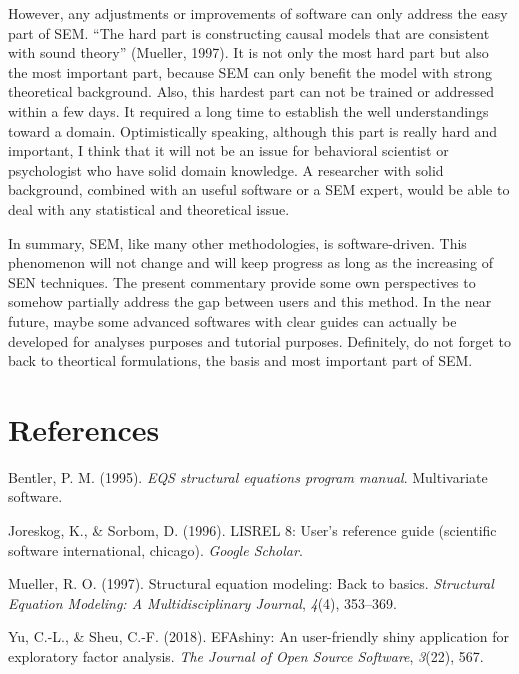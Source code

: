 \documentclass[jou]{apa6}
\theoremstyle{definition}
\theoremstyle{definition}
\theoremstyle{definition}
\theoremstyle{remark}
\begin{document}
However, any adjustments or improvements of software can only address
the easy part of SEM. \enquote{The hard part is constructing causal
models that are consistent with sound theory} (Mueller, 1997). It is not
only the most hard part but also the most important part, because SEM
can only benefit the model with strong theoretical background. Also,
this hardest part can not be trained or addressed within a few days. It
required a long time to establish the well understandings toward a
domain. Optimistically speaking, although this part is really hard and
important, I think that it will not be an issue for behavioral scientist
or psychologist who have solid domain knowledge. A researcher with solid
background, combined with an useful software or a SEM expert, would be
able to deal with any statistical and theoretical issue.

In summary, SEM, like many other methodologies, is software-driven. This
phenomenon will not change and will keep progress as long as the
increasing of SEN techniques. The present commentary provide some own
perspectives to somehow partially address the gap between users and this
method. In the near future, maybe some advanced softwares with clear
guides can actually be developed for analyses purposes and tutorial
purposes. Definitely, do not forget to back to theortical formulations,
the basis and most important part of SEM.

\hypertarget{references}{%
\section{References}\label{references}}

\setlength{\parindent}{-0.5in}
\setlength{\leftskip}{0.5in}

\hypertarget{refs}{}
\leavevmode\hypertarget{ref-bentler1995eqs}{}%
Bentler, P. M. (1995). \emph{EQS structural equations program manual}.
Multivariate software.

\leavevmode\hypertarget{ref-joreskog1996lisrel}{}%
Joreskog, K., \& Sorbom, D. (1996). LISREL 8: User's reference guide
(scientific software international, chicago). \emph{Google Scholar}.

\leavevmode\hypertarget{ref-mueller1997structural}{}%
Mueller, R. O. (1997). Structural equation modeling: Back to basics.
\emph{Structural Equation Modeling: A Multidisciplinary Journal},
\emph{4}(4), 353--369.

\leavevmode\hypertarget{ref-yuefashiny}{}%
Yu, C.-L., \& Sheu, C.-F. (2018). EFAshiny: An user-friendly shiny
application for exploratory factor analysis. \emph{The Journal of Open
Source Software}, \emph{3}(22), 567.
\end{document}
